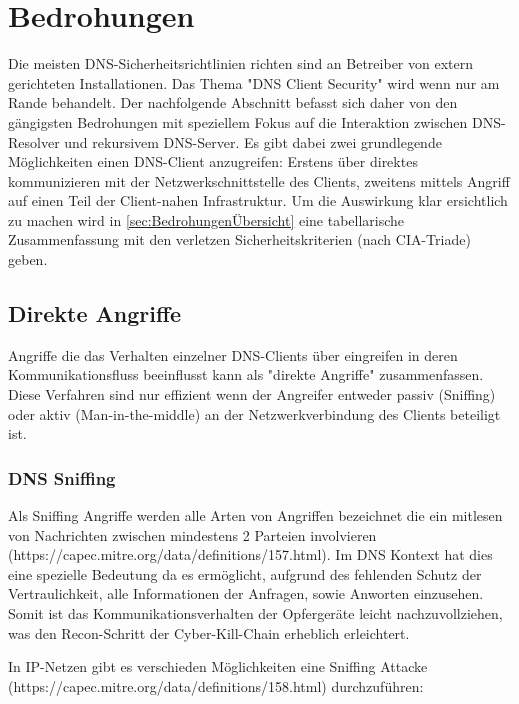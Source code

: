 \chapter{Bedrohungen}

Die meisten DNS-Sicherheitsrichtlinien richten sind an Betreiber von extern gerichteten Installationen. Das Thema "DNS Client Security" wird wenn nur am Rande behandelt. Der nachfolgende Abschnitt befasst sich daher von den gängigsten Bedrohungen mit speziellem Fokus auf die Interaktion zwischen DNS-Resolver und rekursivem DNS-Server. 
Es gibt dabei zwei grundlegende Möglichkeiten einen DNS-Client anzugreifen: Erstens über direktes kommunizieren mit der Netzwerkschnittstelle des Clients, zweitens mittels Angriff auf einen Teil der Client-nahen Infrastruktur. Um die Auswirkung klar ersichtlich zu machen wird in \ref{sec:BedrohungenÜbersicht} eine tabellarische Zusammenfassung mit den verletzen Sicherheitskriterien (nach CIA-Triade) geben. 

\section{Direkte Angriffe}

Angriffe die das Verhalten einzelner DNS-Clients über eingreifen in deren Kommunikationsfluss beeinflusst kann als "direkte Angriffe" zusammenfassen. Diese Verfahren sind nur effizient wenn der Angreifer entweder passiv (Sniffing) oder aktiv (Man-in-the-middle) an der Netzwerkverbindung des Clients beteiligt ist. 

\subsection{DNS Sniffing}

Als Sniffing Angriffe werden alle Arten von Angriffen bezeichnet die ein mitlesen von Nachrichten zwischen mindestens 2 Parteien involvieren (https://capec.mitre.org/data/definitions/157.html). Im DNS Kontext hat dies eine spezielle Bedeutung da es ermöglicht, aufgrund des fehlenden Schutz der Vertraulichkeit, alle Informationen der Anfragen, sowie Anworten einzusehen. Somit ist das Kommunikationsverhalten der Opfergeräte leicht nachzuvollziehen, was den Recon-Schritt der Cyber-Kill-Chain erheblich erleichtert. 

In IP-Netzen gibt es verschieden Möglichkeiten eine Sniffing Attacke (https://capec.mitre.org/data/definitions/158.html) durchzuführen: 

